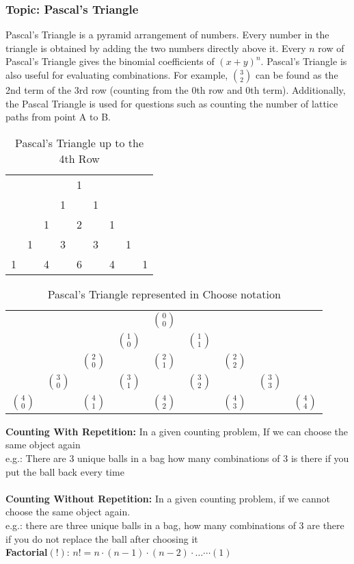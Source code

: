 \documentclass{article}
\begin{document}
\subsubsection{Topic: Pascal's Triangle}
Pascal's Triangle is a pyramid arrangement of numbers. Every number in the triangle is obtained by adding the two numbers directly above it. Every $n$ row of Pascal's Triangle gives the binomial coefficients of $(x+y)^n$. Pascal's Triangle is also useful for evaluating combinations. For example, $3\choose2$ can be found as the 2nd term of the 3rd row (counting from the 0th row and 0th term). Additionally, the Pascal Triangle is used for questions such as counting the number of lattice paths from point A to B. 

\begin{table}[ht]
    \centering
    \begin{tabular}{ccccccccc}
          &&  &  &  1&  &  &  &\\
          &&  &  1&  &  1&  &  &\\
          &&  1&  &  2&  &  1&  &\\
          &1&  &  3&  &  3&  & 1&\\
          1&&  4&  &  6&  &  4&  &1\\
    \end{tabular}
    \caption{Pascal's Triangle up to the 4th Row}
    \label{tab:my_label_five}
\end{table}
\begin{table}[ht]
    \centering
    \begin{tabular}{ccccccccc}
          &&  &  &  $0\choose0$&  &  &  &\\
          &&  &  $1\choose0$&  &  $1\choose1$&  &  &\\
          &&  $2\choose0$&  &  $2\choose1$&  &  $2\choose2$&  &\\
          &$3\choose0$&  &  $3\choose1$&  &  $3\choose2$&  & $3\choose3$&\\
          $4\choose0$&&  $4\choose1$&  &  $4\choose2$&  &  $4\choose3$&  &$4\choose4$\\
    \end{tabular}
    \caption{Pascal's Triangle represented in Choose notation}
    \label{tab:my_label_six}
\end{table}


\textbf{Counting With Repetition:} In a given counting problem, If we can choose the same object again \\
e.g.: There are 3 unique balls in a bag how many combinations of 3 is there if you put the ball back every time\\
\\
\textbf{Counting Without Repetition: }In a given counting problem, if we cannot choose the same object again.\\
e.g.: there are three unique balls in a bag, how many combinations of 3 are there if you do not replace the ball after choosing it \\
\textbf{Factorial}$(!)$: $n!=n\cdot (n-1) \cdot (n-2) \cdot \ldots \cdots (1)$
\end{document}
